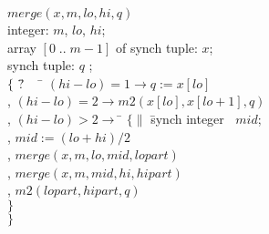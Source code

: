 \begin{tabbing}
$merge(x,m,lo,hi,q)$\\
integer: $m$, $lo$, $hi$; \\
array $[0 \; .. \; m-1]$ of synch tuple: $x$; \\
synch tuple: $q$ ;\\
$\{$ \= ? $\; \; \;$ \= $(hi - lo) = 1 \rightarrow q := x[lo]$ \\
 \> ,  \> $(hi - lo) = 2 \rightarrow m2(x[lo], x[lo+1],q)$ \\
 \> ,  \> $(hi - lo) > 2 \rightarrow$  \= $\{ \| $ \= 
                                                  synch integer $\; \; mid$; \\
                     \> \> \> \>                , $mid := (lo + hi) /2$ \\
                     \> \> \> \>                , $merge(x,m,lo,mid,lopart)$ \\
                     \> \> \> \>                , $merge(x,m,mid,hi,hipart)$ \\
                     \> \> \> \>                , $m2(lopart,hipart,q)$ \\
                    \> \> \>            $\}$ \\
$\}$
\end{tabbing}

